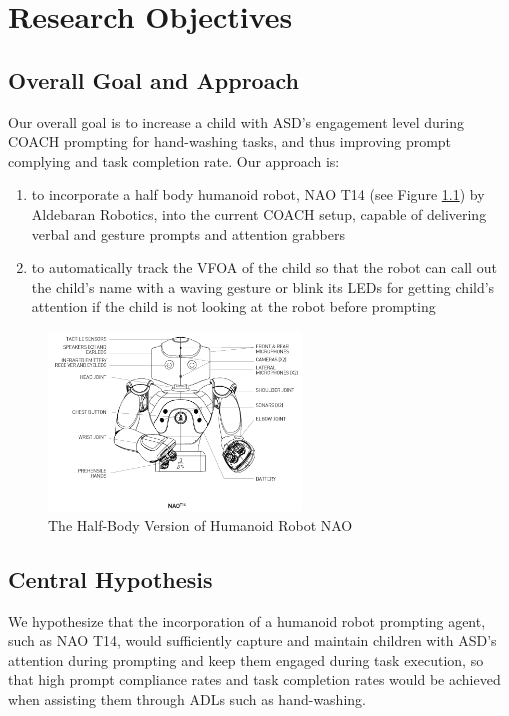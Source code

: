 \chapter{Research Objectives}

\section{Overall Goal and Approach}
Our overall goal is to increase a child with ASD's engagement level during COACH prompting for hand-washing tasks, and thus improving prompt complying and task completion rate.  Our approach is:
\begin{enumerate}
	\item to incorporate a half body humanoid robot, NAO T14 (see Figure \ref{fig:HalfBodyNAO}) by Aldebaran Robotics, into the current COACH setup, capable of delivering verbal and gesture prompts and attention grabbers
	
	\item to automatically track the VFOA of the child so that the robot can call out the child's name with a waving gesture or blink its LEDs for getting child's attention if the child is not looking at the robot before prompting
	
\end{enumerate}
\begin{figure} [h]
	\centering
	\includegraphics[width=0.6\textwidth]{./img/nao_t14_schema}
	\caption{The Half-Body Version of Humanoid Robot NAO}
	\label{fig:HalfBodyNAO}
\end{figure}


\section{Central Hypothesis}
We hypothesize that the incorporation of a humanoid robot prompting agent, such as NAO T14, would sufficiently capture and maintain children with ASD's attention during prompting and keep them engaged during task execution, so that high prompt compliance rates and task completion rates would be achieved when assisting them through ADLs such as hand-washing.


